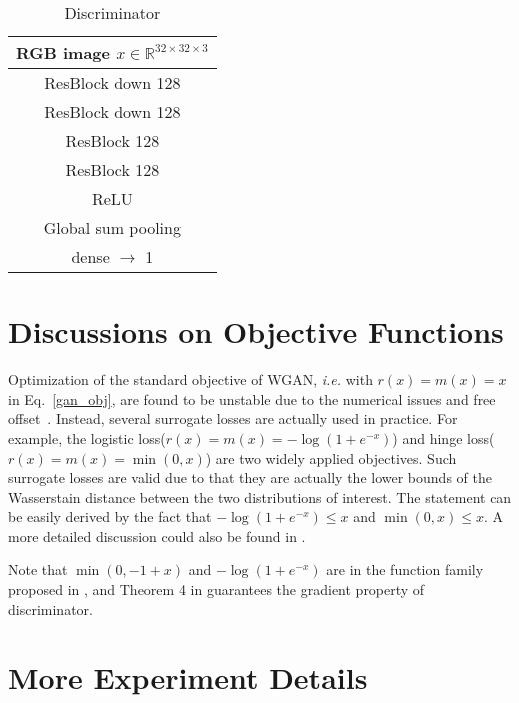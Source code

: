 \documentclass{article}
\begin{document}
\begin{table}[!h]
\centering
\begin{tabular}{c}
    \toprule
    \midrule
    RGB image $x\in \mathbb{R}^{32\times 32 \times 3}$ \\
    \midrule
    ResBlock down 128\\
    \midrule
    ResBlock down 128\\
    \midrule
    ResBlock 128\\
    \midrule
    ResBlock 128\\
    \midrule
    ReLU\\
    \midrule
    Global sum pooling\\
    \midrule
    dense $\rightarrow$ 1\\
    \midrule
    \bottomrule
\end{tabular}
\vspace{+5pt}
\caption{Discriminator}
\end{table}



\section{Discussions on Objective Functions}
\label{app:obj}
Optimization of the standard objective of WGAN, \emph{i.e.} with $r(x) = m(x) = x$ in Eq.~\ref{gan_obj}, are found to be unstable  due to the numerical issues and free offset~\cite{zhou2019lipschitz,miyato2018spectral}. Instead, several surrogate losses are actually used in practice. For example, the logistic loss($r(x) = m(x) = -\log(1+e^{-x})$) and hinge loss($r(x) = m(x) = \min (0,x)$) are two widely applied objectives. Such surrogate losses are valid due to that they are actually the lower bounds of the Wasserstain distance between the two distributions of interest. The statement can be easily derived by the fact that $-\log(1+e^{-x}) \leq x$ and $\min (0,x) \leq x$. A more detailed discussion could also be found in \cite{tanaka2019discriminator}.

Note that $\min (0,-1+x)$ and $-\log(1+e^{-x})$ are in the function family proposed in \cite{zhou2019lipschitz}, and Theorem 4 in \cite{zhou2019lipschitz} guarantees the gradient property of discriminator. 



\section{More Experiment Details}
\label{app:sec:mcmc-stl}
\end{document}
